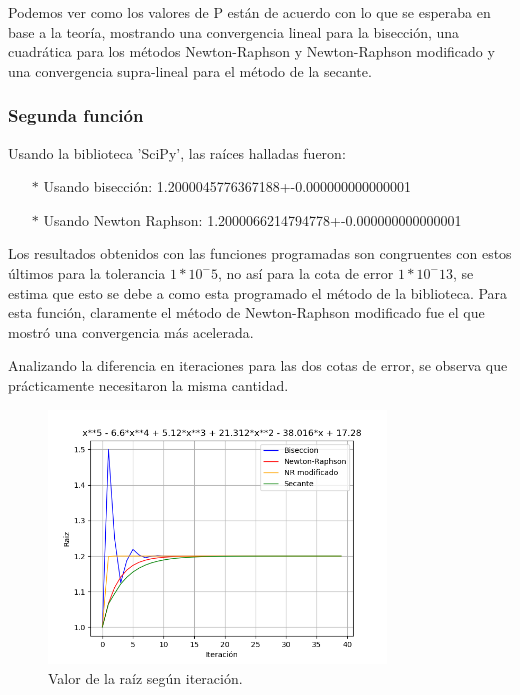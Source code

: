 \documentclass[titlepage,a4paper]{article}
\begin{document}
Podemos ver como los valores de P están de acuerdo con lo que se esperaba en base a la teoría, mostrando una convergencia lineal para la bisección, una cuadrática para los métodos Newton-Raphson y Newton-Raphson modificado y una convergencia supra-lineal para el método de la secante.

\subsubsection{Segunda función}\label{sec:CR2}

Usando la biblioteca 'SciPy', las raíces halladas fueron:
\begin{itemize}
    \item[$*$]Usando bisección:   1.2000045776367188+-0.000000000000001
    \item[$*$]Usando Newton Raphson:  1.2000066214794778+-0.000000000000001
\end{itemize}

Los resultados obtenidos con las funciones programadas son congruentes con estos últimos para la tolerancia $1*10^-5$, no así para la cota de error $1*10^-13$, se estima que esto se debe a como esta programado el método de la biblioteca. Para esta función, claramente el método de Newton-Raphson modificado fue el que mostró una convergencia más acelerada. 

Analizando la diferencia en iteraciones para las dos cotas de error, se observa que prácticamente necesitaron la misma cantidad.
\begin{figure}[H]
\centering
\includegraphics[width=0.8\textwidth]{raiz f2.png}
\caption{\label{fig:class01}Valor de la raíz según iteración.}
\end{figure}
\end{document}
